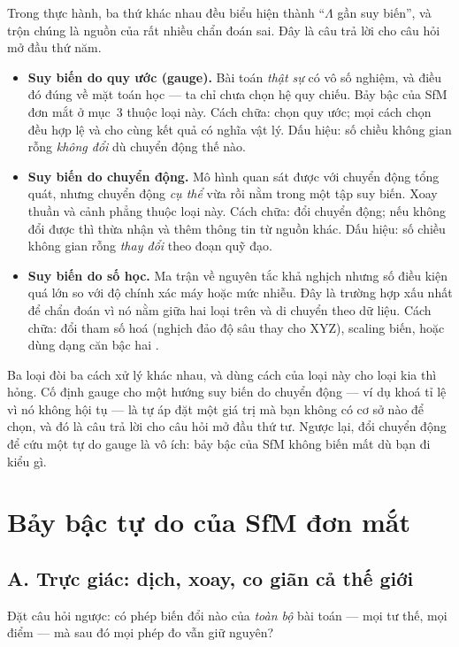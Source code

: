 \documentclass[../../vslam.tex]{subfiles}
\begin{document}
Trong thực hành, ba thứ khác nhau đều biểu hiện thành ``\(\Lambda\) gần suy biến'', và trộn chúng là nguồn của rất nhiều chẩn đoán sai. Đây là câu trả lời cho câu hỏi mở đầu thứ năm.

\begin{itemize}
\item \textbf{Suy biến do quy ước (gauge).} Bài toán \emph{thật sự} có vô số nghiệm, và điều đó đúng về mặt toán học --- ta chỉ chưa chọn hệ quy chiếu. Bảy bậc của SfM đơn mắt ở mục~3 thuộc loại này. Cách chữa: chọn quy ước; mọi cách chọn đều hợp lệ và cho cùng kết quả có nghĩa vật lý. Dấu hiệu: số chiều không gian rỗng \emph{không đổi} dù chuyển động thế nào.
\item \textbf{Suy biến do chuyển động.} Mô hình quan sát được với chuyển động tổng quát, nhưng chuyển động \emph{cụ thể} vừa rồi nằm trong một tập suy biến. Xoay thuần và cảnh phẳng thuộc loại này. Cách chữa: đổi chuyển động; nếu không đổi được thì thừa nhận và thêm thông tin từ nguồn khác. Dấu hiệu: số chiều không gian rỗng \emph{thay đổi} theo đoạn quỹ đạo.
\item \textbf{Suy biến do số học.} Ma trận về nguyên tắc khả nghịch nhưng số điều kiện quá lớn so với độ chính xác máy hoặc mức nhiễu. Đây là trường hợp xấu nhất để chẩn đoán vì nó nằm giữa hai loại trên và di chuyển theo dữ liệu. Cách chữa: đổi tham số hoá (nghịch đảo độ sâu thay cho XYZ), scaling biến, hoặc dùng dạng căn bậc hai \cite{demmel2021rootba}.
\end{itemize}

Ba loại đòi ba cách xử lý khác nhau, và dùng cách của loại này cho loại kia thì hỏng. Cố định gauge cho một hướng suy biến do chuyển động --- ví dụ khoá tỉ lệ vì nó không hội tụ --- là tự áp đặt một giá trị mà bạn không có cơ sở nào để chọn, và đó là câu trả lời cho câu hỏi mở đầu thứ tư. Ngược lại, đổi chuyển động để cứu một tự do gauge là vô ích: bảy bậc của SfM không biến mất dù bạn đi kiểu gì.

\section{Bảy bậc tự do của SfM đơn mắt}

\subsection{A. Trực giác: dịch, xoay, co giãn cả thế giới}

Đặt câu hỏi ngược: có phép biến đổi nào của \emph{toàn bộ} bài toán --- mọi tư thế, mọi điểm --- mà sau đó mọi phép đo vẫn giữ nguyên?
\end{document}
